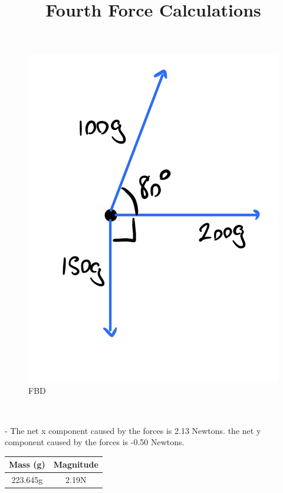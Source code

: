 \documentclass[letter paper, title page]{article}
\begin{document}
\begin{figure}[H]
    \centering
    \includegraphics[scale = 0.1]{FBDQ6.jpg}
    \caption{FBD}
    \label{fig:my_label}
\end{figure}

\begin{list}
    \\ \item - The net x component caused by the forces is 2.13 Newtons. the net y component caused by the forces is -0.50 Newtons.  \\
\end{list}

\noindent
\title{\textbf{Fourth Force Calculations \\}}

\begin{tabular}{|c | c|}

\hline
  Mass (g) & Magnitude\\
 \hline
  223.645g & 2.19N\\
 \hline

\end{tabular} \\
\end{document}
